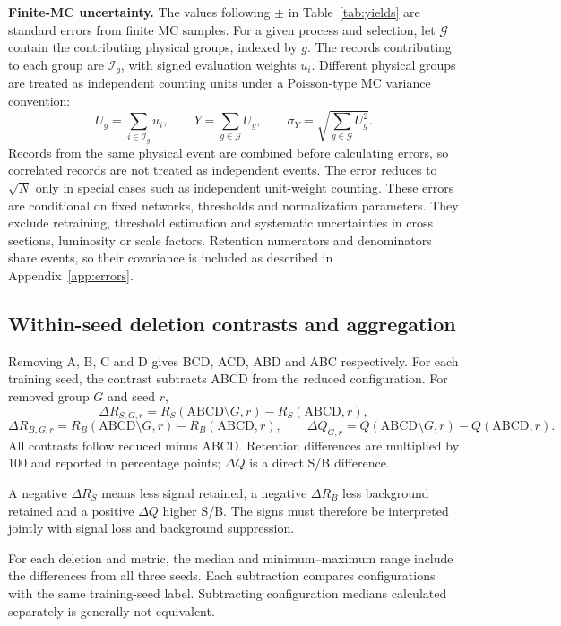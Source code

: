 \documentclass[11pt,a4paper]{article}
\begin{document}
\textbf{Finite-MC uncertainty.}
The values following $\pm$ in Table~\ref{tab:yields} are standard errors from finite MC samples.
For a given process and selection, let $\mathcal G$ contain the contributing physical groups, indexed by $g$. The records contributing to each group are $\mathcal I_g$, with signed evaluation weights $u_i$.
Different physical groups are treated as independent counting units under a Poisson-type MC variance convention:
\[
 U_g=\sum_{i\in\mathcal I_g}u_i,\qquad
 Y=\sum_{g\in\mathcal G}U_g,\qquad
 \sigma_Y=\sqrt{\sum_{g\in\mathcal G}U_g^2}.
\]
Records from the same physical event are combined before calculating errors, so correlated records are not treated as independent events.
The error reduces to $\sqrt{N}$ only in special cases such as independent unit-weight counting.
These errors are conditional on fixed networks, thresholds and normalization parameters. They exclude retraining, threshold estimation and systematic uncertainties in cross sections, luminosity or scale factors.
Retention numerators and denominators share events, so their covariance is included as described in Appendix~\ref{app:errors}.

\subsection{Within-seed deletion contrasts and aggregation}
Removing A, B, C and D gives BCD, ACD, ABD and ABC respectively.
For each training seed, the contrast subtracts ABCD from the reduced configuration.
For removed group $G$ and seed $r$,
\[
 \Delta R_{S,G,r}=R_S(\mathrm{ABCD}\setminus G,r)-R_S(\mathrm{ABCD},r),
\]
\[
 \Delta R_{B,G,r}=R_B(\mathrm{ABCD}\setminus G,r)-R_B(\mathrm{ABCD},r),\qquad
 \Delta Q_{G,r}=Q(\mathrm{ABCD}\setminus G,r)-Q(\mathrm{ABCD},r).
\]
All contrasts follow reduced minus ABCD.
Retention differences are multiplied by 100 and reported in percentage points; $\Delta Q$ is a direct S/B difference.

A negative $\Delta R_S$ means less signal retained, a negative $\Delta R_B$ less background retained and a positive $\Delta Q$ higher S/B.
The signs must therefore be interpreted jointly with signal loss and background suppression.

For each deletion and metric, the median and minimum--maximum range include the differences from all three seeds.
Each subtraction compares configurations with the same training-seed label. Subtracting configuration medians calculated separately is generally not equivalent.
\end{document}
